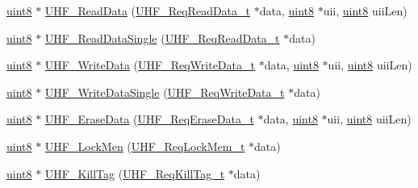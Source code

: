 \begin{DoxyCompactItemize}
\item 
\mbox{\hyperlink{m900dll_8h_adde6aaee8457bee49c2a92621fe22b79}{uint8}} $\ast$ \mbox{\hyperlink{class_m900_dll_a356133adf3ec6c2a533f8402a457c614}{U\+H\+F\+\_\+\+Read\+Data}} (\mbox{\hyperlink{struct_u_h_f___req_read_data__t}{U\+H\+F\+\_\+\+Req\+Read\+Data\+\_\+t}} $\ast$data, \mbox{\hyperlink{m900dll_8h_adde6aaee8457bee49c2a92621fe22b79}{uint8}} $\ast$uii, \mbox{\hyperlink{m900dll_8h_adde6aaee8457bee49c2a92621fe22b79}{uint8}} uii\+Len)
\item 
\mbox{\hyperlink{m900dll_8h_adde6aaee8457bee49c2a92621fe22b79}{uint8}} $\ast$ \mbox{\hyperlink{class_m900_dll_a4aeb054a9ae965ab02ea5d9bc74e5733}{U\+H\+F\+\_\+\+Read\+Data\+Single}} (\mbox{\hyperlink{struct_u_h_f___req_read_data__t}{U\+H\+F\+\_\+\+Req\+Read\+Data\+\_\+t}} $\ast$data)
\item 
\mbox{\hyperlink{m900dll_8h_adde6aaee8457bee49c2a92621fe22b79}{uint8}} $\ast$ \mbox{\hyperlink{class_m900_dll_adcb28ef71c880bcdca8fb0d17a1aa77e}{U\+H\+F\+\_\+\+Write\+Data}} (\mbox{\hyperlink{struct_u_h_f___req_write_data__t}{U\+H\+F\+\_\+\+Req\+Write\+Data\+\_\+t}} $\ast$data, \mbox{\hyperlink{m900dll_8h_adde6aaee8457bee49c2a92621fe22b79}{uint8}} $\ast$uii, \mbox{\hyperlink{m900dll_8h_adde6aaee8457bee49c2a92621fe22b79}{uint8}} uii\+Len)
\item 
\mbox{\hyperlink{m900dll_8h_adde6aaee8457bee49c2a92621fe22b79}{uint8}} $\ast$ \mbox{\hyperlink{class_m900_dll_a72b323462a417a9c40bb0bf832ad7662}{U\+H\+F\+\_\+\+Write\+Data\+Single}} (\mbox{\hyperlink{struct_u_h_f___req_write_data__t}{U\+H\+F\+\_\+\+Req\+Write\+Data\+\_\+t}} $\ast$data)
\item 
\mbox{\hyperlink{m900dll_8h_adde6aaee8457bee49c2a92621fe22b79}{uint8}} $\ast$ \mbox{\hyperlink{class_m900_dll_a1d1ee05b96db7792ac5a7ddfc89d2ba1}{U\+H\+F\+\_\+\+Erase\+Data}} (\mbox{\hyperlink{struct_u_h_f___req_erase_data__t}{U\+H\+F\+\_\+\+Req\+Erase\+Data\+\_\+t}} $\ast$data, \mbox{\hyperlink{m900dll_8h_adde6aaee8457bee49c2a92621fe22b79}{uint8}} $\ast$uii, \mbox{\hyperlink{m900dll_8h_adde6aaee8457bee49c2a92621fe22b79}{uint8}} uii\+Len)
\item 
\mbox{\hyperlink{m900dll_8h_adde6aaee8457bee49c2a92621fe22b79}{uint8}} $\ast$ \mbox{\hyperlink{class_m900_dll_a2966116b5f6e7a04a490d38d27251ff1}{U\+H\+F\+\_\+\+Lock\+Men}} (\mbox{\hyperlink{struct_u_h_f___req_lock_mem__t}{U\+H\+F\+\_\+\+Req\+Lock\+Mem\+\_\+t}} $\ast$data)
\item 
\mbox{\hyperlink{m900dll_8h_adde6aaee8457bee49c2a92621fe22b79}{uint8}} $\ast$ \mbox{\hyperlink{class_m900_dll_ac7166c53f01e514ae3fc2855c4092528}{U\+H\+F\+\_\+\+Kill\+Tag}} (\mbox{\hyperlink{struct_u_h_f___req_kill_tag__t}{U\+H\+F\+\_\+\+Req\+Kill\+Tag\+\_\+t}} $\ast$data)

\end{DoxyCompactItemize}
